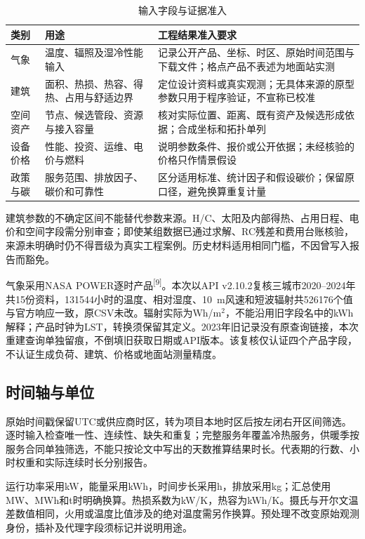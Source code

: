 \documentclass[12pt,a4paper]{article}
\newcommand{\supcite}[1]{\textsuperscript{[#1]}}
\begin{document}
\begin{table}[H]
\centering
\caption{输入字段与证据准入}
\begin{tabularx}{\textwidth}{@{}p{}p{}X@{}}
\toprule
类别 & 用途 & 工程结果准入要求\\
\midrule
气象 & 温度、辐照及湿冷性能输入 & 记录公开产品、坐标、时区、原始时间范围与下载文件；格点产品不表述为地面站实测\\
建筑 & 面积、热损、热容、得热、占用与舒适边界 & 定位设计资料或真实观测；无具体来源的原型参数只用于程序验证，不宣称已校准\\
空间资产 & 节点、候选管段、资源与接入容量 & 核对实际位置、距离、既有资产及候选形成依据；合成坐标和拓扑单列\\
设备价格 & 性能、投资、运维、电价与燃料 & 说明参数条件、报价或公开依据；未经核验的价格只作情景假设\\
政策与碳 & 服务范围、排放因子、碳价和可靠性 & 区分适用标准、统计因子和假设碳价；保留原口径，避免换算重复计量\\
\bottomrule
\end{tabularx}
\end{table}

建筑参数的不确定区间不能替代参数来源。H/C、太阳及内部得热、占用日程、电价和空间字段需分别审查；即使某组数据已通过求解、RC残差和费用台账核验，来源未明确时仍不得晋级为真实工程案例。历史材料适用相同门槛，不因曾写入报告而豁免。

气象采用NASA POWER逐时产品\supcite{9}。本次以API v2.10.2复核三城市2020--2024年共15份资料，131544小时的温度、相对湿度、10~m风速和短波辐射共526176个值与官方响应一致，原CSV未改。辐射实际为Wh/m$^2$，不能沿用旧字段名中的kWh解释；产品时钟为LST，转换须保留其定义。2023年旧记录没有原查询链接，本次重建查询单独留痕，不倒填旧获取日期或API版本。该复核仅认证四个产品字段，不认证生成负荷、建筑、价格或地面站测量精度。

\subsection{时间轴与单位}

原始时间戳保留UTC或供应商时区，转为项目本地时区后按左闭右开区间筛选。逐时输入检查唯一性、连续性、缺失和重复；完整服务年覆盖冷热服务，供暖季按服务合同单独筛选，不能只按论文中写出的天数推算结果时长。代表期的行数、小时权重和实际连续时长分别报告。

运行功率采用kW，能量采用kWh，时间步长采用h，排放采用kg；汇总使用MW、MWh和t时明确换算。热损系数为kW/K，热容为kWh/K。摄氏与开尔文温差数值相同，火用或温度比值涉及的绝对温度需另作换算。预处理不改变原始观测身份，插补及代理字段须标记并说明用途。
\end{document}
